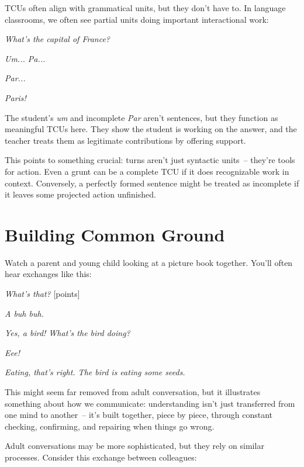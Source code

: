 TCUs often align with grammatical units, but they don't have to. In language classrooms, we often see partial units doing important interactional work:

\ea
\begin{dialogue}
\item[Teacher] \textit{What's the capital of France?}
\item[Student] \textit{Um... Pa...}
\item[Teacher] \textit{Par...}
\item[Student] \textit{Paris!}
\end{dialogue}
\z
The student's \textit{um} and incomplete \textit{Par} aren't sentences, but they function as meaningful TCUs here. They show the student is working on the answer, and the teacher treats them as legitimate contributions by offering support.

This points to something crucial: turns aren't just syntactic units~-- they're tools for action. Even a grunt can be a complete TCU if it does recognizable work in context. Conversely, a perfectly formed sentence might be treated as incomplete if it leaves some projected action unfinished.

\section{Building Common Ground} \label{sec:common-ground}

Watch a parent and young child looking at a picture book together. You'll often hear exchanges like this:

\ea
\begin{dialogue}
\item[Parent] \textit{What's that?} [points]
\item[Child] \textit{A buh buh.}
\item[Parent] \textit{Yes, a bird! What's the bird doing?}
\item[Child] \textit{Eee!}
\item[Parent] \textit{Eating, that's right. The bird is eating some seeds.}
\end{dialogue}
\z
This might seem far removed from adult conversation, but it illustrates something about how we communicate: understanding isn't just transferred from one mind to another~-- it's built together, piece by piece, through constant checking, confirming, and repairing when things go wrong. 

Adult conversations may be more sophisticated, but they rely on similar processes. Consider this exchange between colleagues:

